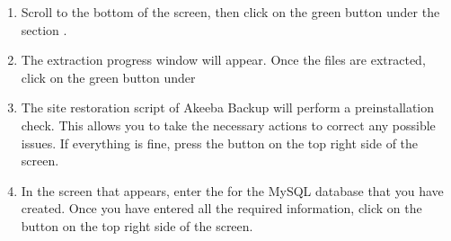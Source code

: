 \documentclass[letterpaper,10pt,english]{sphinxmanual}
\begin{document}
\begin{enumerate}
\begin{figure}[htbp]
\centering

\noindent{}
\end{figure}

\newpage

\item {} 
\sphinxAtStartPar
Scroll to the bottom of the screen, then click on the  green button under the section .

\begin{figure}[htbp]
\centering

\noindent{}
\end{figure}

\item {} 
\sphinxAtStartPar
The extraction progress window will appear. Once the files are extracted, click on the green button  under 

\begin{figure}[htbp]
\centering

\noindent{}
\end{figure}

\item {} 
\sphinxAtStartPar
The site restoration script of Akeeba Backup will perform a pre\sphinxhyphen{}installation check. This allows you to take the necessary actions to correct any possible issues. If everything is fine, press the button  on the top right side of the screen.

\begin{figure}[htbp]
\centering

\noindent{}
\end{figure}

\newpage

\item {} 
\sphinxAtStartPar
In the screen that appears, enter the {\hyperref[\detokenize{joomla-to-vps:credentials}]{}} for the MySQL database that you have created. Once you have entered all the required information, click on the button  on the top right side of the screen.

\begin{figure}[htbp]
\centering


\end{figure}
\end{enumerate}
\end{document}
